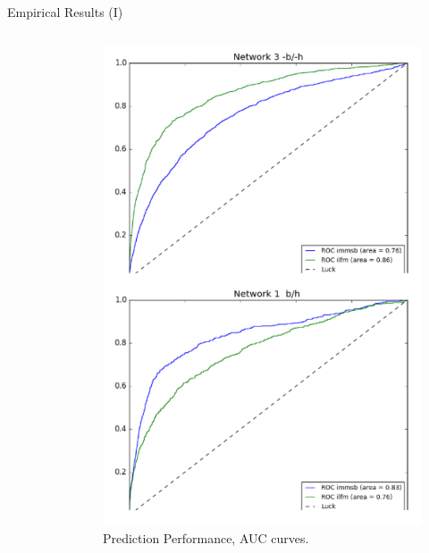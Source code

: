 \begin{frame}[c]{Empirical Results (I)}
\begin{columns}[t]
\begin{column}{0.5\textwidth}
\begin{figure}[h]
        \end{figure}
        \end{column}
        \begin{column}{0.5\textwidth}
        \begin{figure}[h]
            \caption{Prediction Performance, AUC curves.}
        \includegraphics[scale=0.25]{img/auc.pdf}
        \end{figure}
        \end{column}
    \end{columns}

\end{frame}


